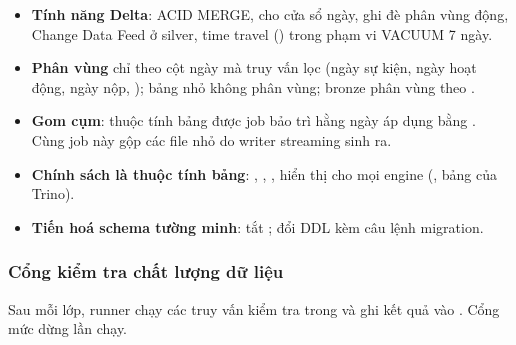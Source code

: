 \begin{itemize}
  \item \textbf{Tính năng Delta}: ACID MERGE,  cho cửa sổ ngày, ghi đè phân vùng động, Change Data Feed ở silver, time travel () trong phạm vi VACUUM 7 ngày.
  \item \textbf{Phân vùng} chỉ theo cột ngày mà truy vấn lọc (ngày sự kiện, ngày hoạt động, ngày nộp, ); bảng nhỏ không phân vùng; bronze phân vùng theo .
  \item \textbf{Gom cụm}: thuộc tính bảng  được job bảo trì hằng ngày áp dụng bằng . Cùng job này gộp các file nhỏ do writer streaming sinh ra.
  \item \textbf{Chính sách là thuộc tính bảng}: , , ,  hiển thị cho mọi engine (, bảng  của Trino).
  \item \textbf{Tiến hoá schema tường minh}: tắt ; đổi DDL kèm câu lệnh migration.
\end{itemize}

\subsubsection{Cổng kiểm tra chất lượng dữ liệu}

Sau mỗi lớp, runner chạy các truy vấn kiểm tra trong  và ghi kết quả vào . Cổng mức  dừng lần chạy.

